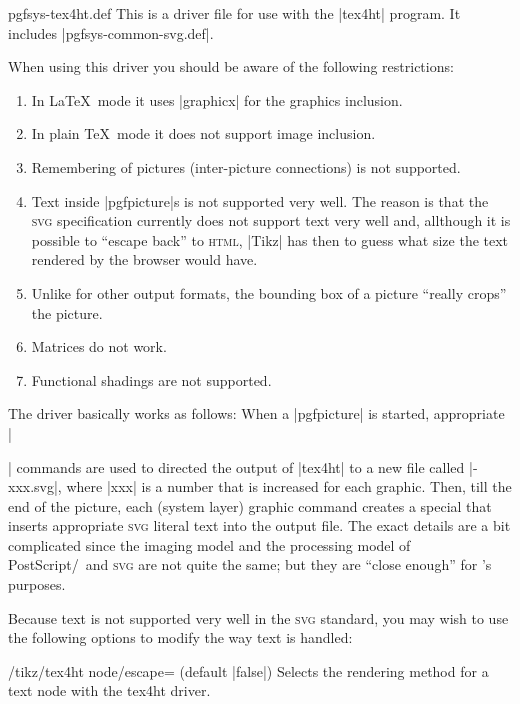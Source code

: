 \begin{filedescription}{pgfsys-tex4ht.def}
  This is a driver file for use with the |tex4ht| program. It includes
  |pgfsys-common-svg.def|.

  When using this driver you should be aware of the following
  restrictions: 
  \begin{enumerate}
  \item
    In \LaTeX\ mode it uses |graphicx| for the graphics
    inclusion.    
  \item
    In plain \TeX\ mode it does not support image inclusion.
  \item
    Remembering of pictures (inter-picture connections) is not
    supported. 
  \item
    Text inside |pgfpicture|s is not supported very well. The reason
    is that the \textsc{svg} specification currently does not support
    text very well and, allthough it is  possible to ``escape
    back'' to \textsc{html}, |Tikz| has then to guess what size the text 
    rendered by the browser would have. 
  \item
    Unlike for other output formats, the bounding box of a picture
    ``really crops'' the picture.
  \item
    Matrices do not work.
  \item
    Functional shadings are not supported.
  \end{enumerate}

  The driver basically works as follows: When a |{pgfpicture}| is
  started, appropriate |\special| commands are used to directed the
  output of |tex4ht| to a new file called |\jobname-xxx.svg|, where
  |xxx| is a number that is increased for each graphic. Then, till the
  end of the picture, each (system layer) graphic command creates a
  special that inserts appropriate \textsc{svg} literal text into the
  output file. The exact details are a bit complicated since the
  imaging model and the processing model of PostScript/\pdf\ and
  \textsc{svg} are not quite the same; but they are ``close enough''
  for \pgfname's purposes.
  
  Because text is not supported very well in the
  \textsc{svg} standard, you may wish to use the following options to
  modify the way text is handled:

  \begin{key}{/tikz/tex4ht node/escape= (default |false|)}
    Selects the rendering method for a text node with the tex4ht driver. 
  

\end{key}
\end{filedescription}
